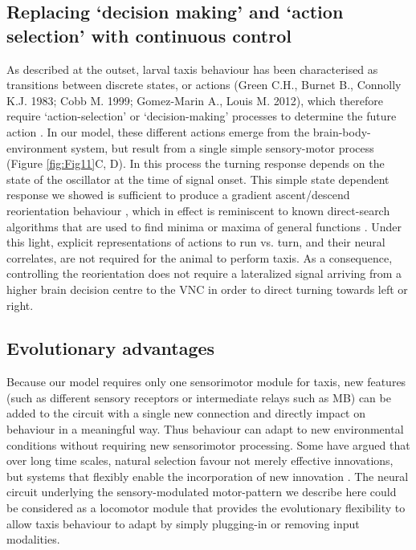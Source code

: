 \documentclass[10pt,a4paper]{article}
\begin{document}
\subsection{Replacing ‘decision making’ and ‘action selection’ with continuous control}
As described at the outset, larval taxis behaviour has been characterised as transitions between discrete states, or actions (Green C.H., Burnet B., Connolly K.J. 1983; Cobb M. 1999; Gomez-Marin A., Louis M. 2012), which therefore require ‘action-selection’ or ‘decision-making’ processes to determine the future action \citep{gomez2014multilevel}.
   In our model, these different actions emerge from the brain-body-environment system, but result from a single simple sensory-motor process (Figure \ref{fig:Fig11}C, D).
    In this process the turning response depends on the state of the oscillator at the time of signal onset. This simple state dependent response we showed is sufficient to produce a gradient ascent/descend reorientation behaviour \cite[see][ for example]{izquierdo2010evolution}, which in effect is reminiscent to known direct-search algorithms that are used to find minima or maxima of general functions \cite[see][]{snyman2005line}. 
Under this light, explicit representations of actions to run vs. turn, and their neural correlates, are not required for the animal to perform taxis. 
As a consequence, controlling the reorientation does not require a lateralized signal arriving from a higher brain decision centre to the VNC in order to direct turning towards left or right.

\subsection{Evolutionary advantages}

Because our model requires only one sensorimotor module for taxis, new features (such as different sensory receptors or intermediate relays such as MB) can be added to the circuit with a single new connection and directly impact on behaviour in a meaningful way. Thus behaviour can adapt to new environmental conditions  without requiring new sensorimotor processing. Some have argued that over long time scales, natural selection favour not merely effective innovations, but systems that flexibly enable the incorporation of new innovation \citep{vermeij1973adaptation}. The neural circuit underlying the sensory-modulated motor-pattern we describe here could be considered as a locomotor module that provides the evolutionary flexibility to allow taxis behaviour to adapt by simply plugging-in or removing input modalities. 
\end{document}
